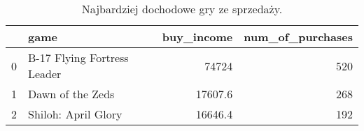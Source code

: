 \begin{table}[h]
\centering
\caption{Najbardziej dochodowe gry ze sprzedaży.}\label{tab:purchases}
\begin{tabular}{rlrr}
\hline
    & game                        &   buy\_income &   num\_of\_purchases \\
\hline
  0 & B-17 Flying Fortress Leader &      74724   &                520 \\
  1 & Dawn of the Zeds            &      17607.6 &                268 \\
  2 & Shiloh: April Glory         &      16646.4 &                192 \\
\hline
\end{tabular}\end{table}